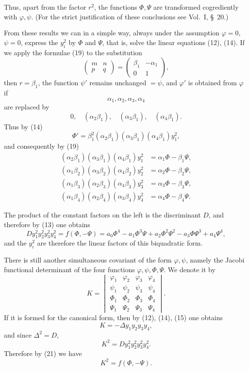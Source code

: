 \documentclass[11pt]{article}
\begin{document}
Thus, apart from the factor $r^2$, the functions $\Phi,\Psi$ are transformed cogrediently with $\varphi,\psi$. (For the strict justification of these conclusions see Vol.~I, \S~20.)

From these results we can in a simple way, always under the assumption $\varphi=0$, $\psi=0$, express the $y_i^2$ by $\Phi$ and $\Psi$, that is, solve the linear equations (12), (14). If we apply the formulae (19) to the substitution
\[
\begin{pmatrix}m&n\\ p&q\end{pmatrix}
=
\begin{pmatrix}\beta_1&-\alpha_1\\ 0&1\end{pmatrix},
\]
then $r=\beta_1$, the function $\psi'$ remains unchanged $=\psi$, and $\varphi'$ is obtained from $\varphi$ if
\[
\alpha_1,\alpha_2,\alpha_3,\alpha_4
\]
are replaced by
\[
0,\quad (\alpha_2\beta_1),\quad (\alpha_3\beta_1),\quad (\alpha_4\beta_1).
\]
Thus by (14)
\[
\Phi'=\beta_1^2(\alpha_2\beta_1)(\alpha_3\beta_1)(\alpha_4\beta_1)y_1^2,
\]
and consequently by (19)
\begin{equation}
\begin{aligned}
(\alpha_2\beta_1)(\alpha_3\beta_1)(\alpha_4\beta_1)y_1^2&=\alpha_1\Phi-\beta_1\Psi,\\
(\alpha_1\beta_2)(\alpha_3\beta_2)(\alpha_4\beta_2)y_2^2&=\alpha_2\Phi-\beta_2\Psi,\\
(\alpha_1\beta_3)(\alpha_2\beta_3)(\alpha_4\beta_3)y_3^2&=\alpha_3\Phi-\beta_3\Psi,\\
(\alpha_1\beta_4)(\alpha_2\beta_4)(\alpha_3\beta_4)y_4^2&=\alpha_4\Phi-\beta_4\Psi.
\end{aligned}
\tag{20}
\end{equation}

The product of the constant factors on the left is the discriminant $D$, and therefore by (13) one obtains
\begin{equation}
D y_1^2y_2^2y_3^2y_4^2=f(\Phi,-\Psi)
=a_0\Phi^4-a_1\Phi^3\Psi+a_2\Phi^2\Psi^2-a_3\Phi\Psi^3+a_4\Psi^4,
\tag{21}
\end{equation}
and the $y_i^2$ are therefore the linear factors of this biquadratic form.

There is still another simultaneous covariant of the form $\varphi,\psi$, namely the Jacobi functional determinant of the four functions $\varphi,\psi,\Phi,\Psi$. We denote it by
\begin{equation}
K=
\begin{vmatrix}
\varphi_1&\varphi_2&\varphi_3&\varphi_4\\
\psi_1&\psi_2&\psi_3&\psi_4\\
\Phi_1&\Phi_2&\Phi_3&\Phi_4\\
\Psi_1&\Psi_2&\Psi_3&\Psi_4
\end{vmatrix}.
\tag{22}
\end{equation}
If it is formed for the canonical form, then by (12), (14), (15) one obtains
\[
K=-\Delta y_1y_2y_3y_4,
\]
and since $\Delta^2=D$,
\[
K^2=D y_1^2y_2^2y_3^2y_4^2.
\]
Therefore by (21) we have
\begin{equation}
K^2=f(\Phi,-\Psi).
\tag{23}
\end{equation}
\end{document}
